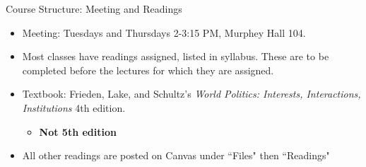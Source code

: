 \documentclass[handout]{beamer}
\begin{document}

\begin{frame}{\LARGE Course Structure: Meeting and Readings}
	\begin{itemize}
		\item Meeting: Tuesdays and Thursdays 2-3:15 PM, Murphey Hall 104.
		\item Most classes have readings assigned, listed in syllabus. These are to be completed before the lectures for which they are assigned.
		\item Textbook: Frieden, Lake, and Schultz's \textit{World Politics: Interests, Interactions, Institutions} 4th edition.
		\begin{itemize}
			\item \textbf{Not 5th edition}
		\end{itemize}
		\item All other readings are posted on Canvas under ``Files" then ``Readings"
	\end{itemize}
\end{frame}
\end{document}
